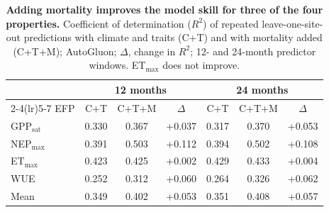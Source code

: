 \begin{table}[htbp]
\centering
\caption{\textbf{Adding mortality improves the model skill for three of the four properties.} Coefficient of determination ($R^2$) of repeated leave-one-site-out predictions with climate and traits (C+T) and with mortality added (C+T+M); AutoGluon; $\Delta$, change in $R^2$; 12- and 24-month predictor windows. ET$_\mathrm{max}$ does not improve.}
\label{tab:r2}
\footnotesize
\begin{tabular}{lcccccc}
\toprule
 & \multicolumn{3}{c}{12 months} & \multicolumn{3}{c}{24 months} \\
\cmidrule(lr){2-4}\cmidrule(lr){5-7}
EFP & C+T & C+T+M & $\Delta$ & C+T & C+T+M & $\Delta$ \\
\midrule
GPP$_\mathrm{sat}$ & 0.330 & 0.367 & +0.037 & 0.317 & 0.370 & +0.053 \\
NEP$_\mathrm{max}$ & 0.391 & 0.503 & +0.112 & 0.394 & 0.502 & +0.108 \\
ET$_\mathrm{max}$  & 0.423 & 0.425 & +0.002 & 0.429 & 0.433 & +0.004 \\
WUE                & 0.252 & 0.312 & +0.060 & 0.264 & 0.326 & +0.062 \\
\midrule
Mean               & 0.349 & 0.402 & +0.053 & 0.351 & 0.408 & +0.057 \\
\bottomrule
\end{tabular}
\end{table}

